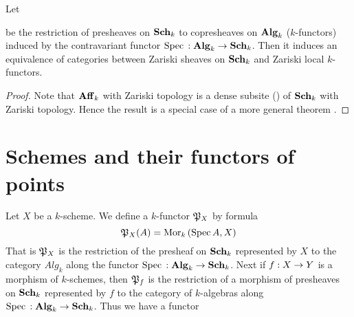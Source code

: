 \begin{theorem}\label{theorem:sheavesonschemesarelocalkfunctors}
Let
\begin{center}
\end{center}
be the restriction of presheaves on $\mathbf{Sch}_k$ to copresheaves on $\mathbf{Alg}_k$ ($k$-functors) induced by the contravariant functor $\mathrm{Spec}\,:\mathbf{Alg}_k\rightarrow \mathbf{Sch}_k$. Then it induces an equivalence of categories between Zariski sheaves on $\mathbf{Sch}_k$ and Zariski local $k$-functors.
\end{theorem}
\begin{proof}
Note that $\mathbf{Aff}_k$ with Zariski topology is a dense subsite ({\cite[definition 4.4]{Sheaves}}) of $\mathbf{Sch}_k$ with Zariski topology. Hence the result is a special case of a more general theorem {\cite[Theorem 4.6]{Sheaves}}. 
\end{proof}

\section{Schemes and their functors of points}
\noindent
Let $X$ be a $k$-scheme. We define a $k$-functor ${\mathfrak P}_X$ by formula
$${\mathfrak P}_X(A) = \mathrm{Mor}_k\left(\mathrm{Spec}\, A,X\right)$$
That is ${\mathfrak P}_X$ is the restriction of the presheaf on $\mathbf{Sch}_k$ represented by $X$ to the category $Alg_k$ along the functor $\mathrm{Spec}\,:\mathbf{Alg}_k\rightarrow \mathbf{Sch}_k$. Next if $f:X\rightarrow Y$ is a morphism of $k$-schemes, then ${\mathfrak P}_f$ is the restriction of a morphism of presheaves on $\mathbf{Sch}_k$ represented by $f$ to the category of $k$-algebras along $\mathrm{Spec}\,:\mathbf{Alg}_k\rightarrow \mathbf{Sch}_k$. Thus we have a functor
\begin{center}
\end{center}

